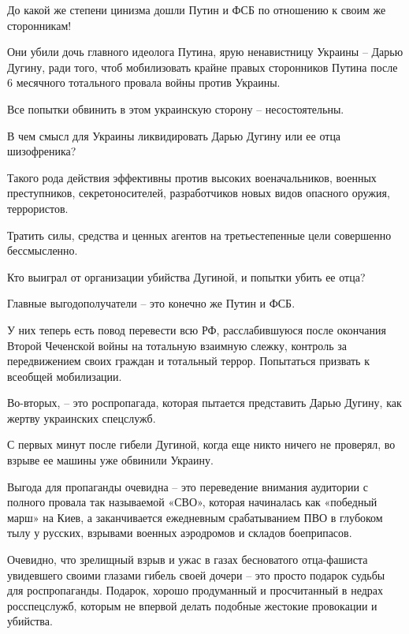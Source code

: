  
 
 
 
 

До какой же степени цинизма дошли Путин и ФСБ по отношению к своим же
сторонникам!

Они убили дочь главного идеолога Путина, ярую ненавистницу Украины – Дарью
Дугину, ради того, чтоб мобилизовать крайне правых сторонников Путина после 6
месячного тотального провала войны против Украины.

Все попытки обвинить в этом украинскую сторону – несостоятельны.

В чем смысл для Украины ликвидировать Дарью Дугину или ее отца шизофреника?

Такого рода действия эффективны против высоких военачальников, военных
преступников, секретоносителей, разработчиков новых видов опасного оружия,
террористов.

Тратить силы, средства и ценных агентов на третьестепенные цели совершенно
бессмысленно.

Кто выиграл от организации убийства Дугиной, и попытки убить ее отца?

Главные выгодополучатели – это конечно же Путин и ФСБ.

У них теперь есть повод перевести всю РФ, расслабившуюся после окончания Второй
Чеченской войны на тотальную взаимную слежку, контроль за передвижением своих
граждан и тотальный террор. Попытаться призвать к всеобщей мобилизации.

Во-вторых, – это роспропагада, которая пытается представить Дарью Дугину, как
жертву украинских спецслужб.

С первых минут после гибели Дугиной, когда еще никто ничего не проверял, во
взрыве ее машины уже обвинили Украину.

Выгода для пропаганды очевидна – это переведение внимания аудитории с полного
провала так называемой «СВО», которая начиналась как «победный марш» на Киев, а
заканчивается ежедневным срабатыванием ПВО в глубоком тылу у русских, взрывами
военных аэродромов и складов боеприпасов.

Очевидно, что зрелищный взрыв и ужас в газах бесноватого отца-фашиста
увидевшего своими глазами гибель своей дочери – это просто подарок судьбы для
роспропаганды. Подарок, хорошо продуманный и просчитанный в недрах
росспецслужб, которым не впервой делать подобные жестокие провокации и
убийства.

